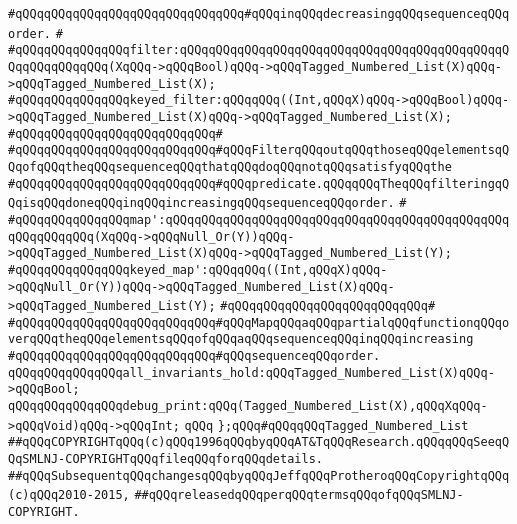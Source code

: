 \verb|#qQQqqQQqqQQqqQQqqQQqqQQqqQQqqQQq#qQQqinqQQqdecreasingqQQqsequenceqQQqorder.|\newline
\verb|#|\newline
\verb|#qQQqqQQqqQQqqQQqfilter:qQQqqQQqqQQqqQQqqQQqqQQqqQQqqQQqqQQqqQQqqQQqqQQqqQQqqQQqqQQq(XqQQq->qQQqBool)qQQq->qQQqTagged_Numbered_List(X)qQQq->qQQqTagged_Numbered_List(X);|\newline
\verb|#qQQqqQQqqQQqqQQqkeyed_filter:qQQqqQQq((Int,qQQqX)qQQq->qQQqBool)qQQq->qQQqTagged_Numbered_List(X)qQQq->qQQqTagged_Numbered_List(X);|\newline
\verb|#qQQqqQQqqQQqqQQqqQQqqQQqqQQq#|\newline
\verb|#qQQqqQQqqQQqqQQqqQQqqQQqqQQq#qQQqFilterqQQqoutqQQqthoseqQQqelementsqQQqofqQQqtheqQQqsequenceqQQqthatqQQqdoqQQqnotqQQqsatisfyqQQqthe|\newline
\verb|#qQQqqQQqqQQqqQQqqQQqqQQqqQQq#qQQqpredicate.qQQqqQQqTheqQQqfilteringqQQqisqQQqdoneqQQqinqQQqincreasingqQQqsequenceqQQqorder.|\newline
\verb|#|\newline
\verb|#qQQqqQQqqQQqqQQqmap':qQQqqQQqqQQqqQQqqQQqqQQqqQQqqQQqqQQqqQQqqQQqqQQqqQQqqQQqqQQq(XqQQq->qQQqNull_Or(Y))qQQq->qQQqTagged_Numbered_List(X)qQQq->qQQqTagged_Numbered_List(Y);|\newline
\verb|#qQQqqQQqqQQqqQQqkeyed_map':qQQqqQQq((Int,qQQqX)qQQq->qQQqNull_Or(Y))qQQq->qQQqTagged_Numbered_List(X)qQQq->qQQqTagged_Numbered_List(Y);|\newline
\verb|#qQQqqQQqqQQqqQQqqQQqqQQqqQQq#|\newline
\verb|#qQQqqQQqqQQqqQQqqQQqqQQqqQQq#qQQqMapqQQqaqQQqpartialqQQqfunctionqQQqoverqQQqtheqQQqelementsqQQqofqQQqaqQQqsequenceqQQqinqQQqincreasing|\newline
\verb|#qQQqqQQqqQQqqQQqqQQqqQQqqQQq#qQQqsequenceqQQqorder.|\newline
\newline
\verb|qQQqqQQqqQQqqQQqall_invariants_hold:qQQqTagged_Numbered_List(X)qQQq->qQQqBool;|\newline
\newline
\verb|qQQqqQQqqQQqqQQqdebug_print:qQQq(Tagged_Numbered_List(X),qQQqXqQQq->qQQqVoid)qQQq->qQQqInt;|\newline
\verb|qQQq|\newline
\verb|};qQQq#qQQqqQQqTagged_Numbered_List|\newline
\newline
\newline
\verb|##qQQqCOPYRIGHTqQQq(c)qQQq1996qQQqbyqQQqAT&TqQQqResearch.qQQqqQQqSeeqQQqSMLNJ-COPYRIGHTqQQqfileqQQqforqQQqdetails.|\newline
\verb|##qQQqSubsequentqQQqchangesqQQqbyqQQqJeffqQQqProtheroqQQqCopyrightqQQq(c)qQQq2010-2015,|\newline
\verb|##qQQqreleasedqQQqperqQQqtermsqQQqofqQQqSMLNJ-COPYRIGHT.|\newline

